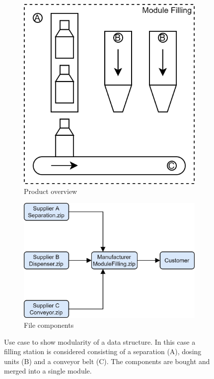 	\begin{figure}[htp]
		\centering
		\begin{subfigure}{.30\textwidth}
			\centering
			\includegraphics[width=.95\linewidth]{figures/UseCaseDataStructureOverviewProduct.jpg}
			\caption{Product overview}
			\label{fig:DataStruktureUseLayout}
		\end{subfigure}
		\hspace{20mm}
		\begin{subfigure}{.45\textwidth}
			\centering
		    \includegraphics[width=.95\linewidth]{figures/UseCaseDataStructureFileComponents.jpg}
			\caption{File components}
			\label{fig:DataStruktureComponents}
		\end{subfigure}
		\caption[Use case to show modularity of a data structure.]{Use case to show modularity of a data structure. In this case a filling station is considered consisting of a separation (A), dosing units (B) and a conveyor belt (C). The components are bought and merged into a single module.}
		\label{fig:DataStruktureUseCase}
	\end{figure}

